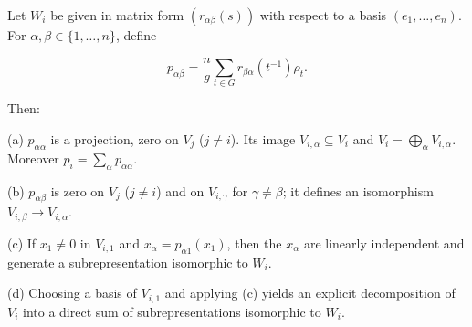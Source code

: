 Let $W_i$ be given in matrix form $(r_{\alpha\beta}(s))$ with respect to a basis $(e_1, \ldots, e_n)$. For $\alpha, \beta \in \{1, \ldots, n\}$, define

$$p_{\alpha\beta} = \frac{n}{g} \sum_{t \in G} r_{\beta\alpha}(t^{-1}) \rho_t.$$

Then:

(a) $p_{\alpha\alpha}$ is a projection, zero on $V_j$ ($j \neq i$). Its image $V_{i,\alpha} \subseteq V_i$ and $V_i = \bigoplus_{\alpha} V_{i,\alpha}$. Moreover $p_i = \sum_\alpha p_{\alpha\alpha}$.

(b) $p_{\alpha\beta}$ is zero on $V_j$ ($j \neq i$) and on $V_{i,\gamma}$ for $\gamma \neq \beta$; it defines an isomorphism $V_{i,\beta} \to V_{i,\alpha}$.

(c) If $x_1 \neq 0$ in $V_{i,1}$ and $x_\alpha = p_{\alpha1}(x_1)$, then the $x_\alpha$ are linearly independent and generate a subrepresentation isomorphic to $W_i$.

(d) Choosing a basis of $V_{i,1}$ and applying (c) yields an explicit decomposition of $V_i$ into a direct sum of subrepresentations isomorphic to $W_i$.
